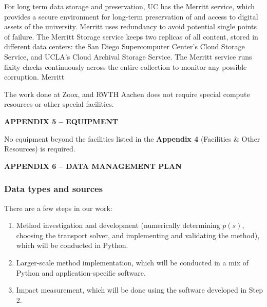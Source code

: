 \documentclass[12pt]{article}
\begin{document}
For long term data storage and preservation, UC has the Merritt service, which provides a secure environment for long-term preservation of and access to digital assets of the university.  Merritt uses redundancy to avoid potential single points of failure. The Merritt Storage service keeps two replicas of all content, stored in different data centers: the San Diego Supercomputer Center's Cloud Storage Service, and UCLA's Cloud Archival Storage Service. The Merritt service runs fixity checks continuously across the entire collection to monitor any possible corruption. Merritt 

The work done at Zoox, and RWTH Aachen does not require special compute resources or other special facilities. 


\pagebreak


\begin{center}
{\bf APPENDIX 5 -- EQUIPMENT}
\end{center}

No equipment beyond the facilities listed in the \textbf{Appendix 4} (Facilities \& Other Resources) is required.

\pagebreak


\begin{center}
{\bf APPENDIX 6 -- DATA MANAGEMENT PLAN}
\end{center}
\vspace{-20pt}

\subsubsection*{Data types and sources}\vspace{-15pt}
There are a few steps in our work:\vspace{-10pt}
\begin{enumerate}
\item Method investigation and development (numerically determining $p(s)$, choosing the transport solver, and implementing and validating the method), which will be conducted in Python.\vspace{-10pt}
\item Larger-scale method implementation, which will be conducted in a mix of Python and application-specific software.\vspace{-10pt}
\item Impact measurement, which will be done using the software developed in Step 2.\vspace{-5pt}
\end{enumerate}
\end{document}
